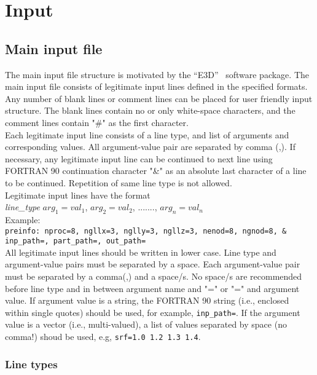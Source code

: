 \chapter{Input}
\label{chap:input}
\section{Main input file}

The main input file structure is motivated by the ``E3D''~\citep{larsen1995} software package. The main input file consists of legitimate input lines defined in the specified formats. Any number of blank lines or comment lines can be placed for user friendly input structure. The blank lines contain no or only white-space characters, and the comment lines contain "\#" as the first character. \\

Each legitimate input line consists of a line type, and list of arguments and corresponding values. All argument-value pair are separated by comma (,). If necessary, any legitimate input line can be continued to next line using FORTRAN 90 continuation  character "\&" as an absolute last character of a line to be continued. Repetition of same line type is not allowed.\\

Legitimate input lines have the format\\
{\it{line\_type}} $arg_1=val_1$, $arg_2=val_2$, ......., $arg_n=val_n$\\

Example:\\
\texttt{preinfo: nproc=8, ngllx=3, nglly=3, ngllz=3, nenod=8, ngnod=8, \& \\
inp\_path=, part\_path=, out\_path=}\\

All legitimate input lines should be written in lower case. Line type and argument-value pairs must be separated by a space. Each argument-value pair must be separated by a comma(,) and a space/s. No space/s are recommended before line type and in between argument name and "=" or "=" and argument value. If argument value is a string, the FORTRAN 90 string (i.e., enclosed within single quotes) should be used, for example, \texttt{inp\_path=}. If the argument value is a vector (i.e., multi-valued), a list of values separated by space (no comma!) shoud be used, e.g, \texttt{srf=1.0 1.2 1.3 1.4}.

\subsection{Line types}

